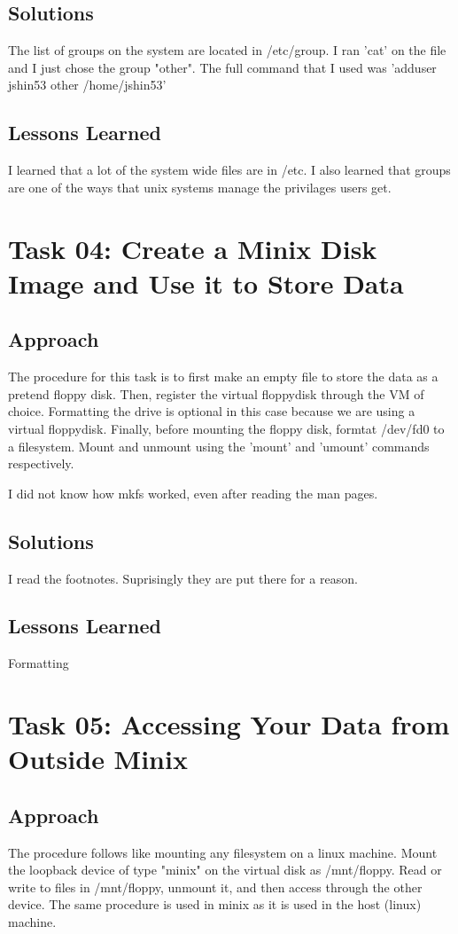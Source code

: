 \documentclass[11pt]{article}
\begin{document}
\subsection*{Solutions}
The list of groups on the system are located in /etc/group. I ran 'cat' on the file and I just chose the group "other". The full command that I used was 'adduser jshin53 other /home/jshin53'

\subsection*{Lessons Learned}
I learned that a lot of the system wide files are in /etc. I also learned that groups are one of the ways that unix systems manage the privilages users get.


\section*{Task 04: Create a Minix Disk Image and Use it to Store Data}
\subsection*{Approach}
The procedure for this task is to first make an empty file to store the data as a pretend floppy disk. Then, register the virtual floppydisk through the VM of choice. Formatting the drive is optional in this case because we are using a virtual floppydisk. Finally, before mounting the floppy disk, formtat /dev/fd0 to a filesystem. Mount and unmount using the 'mount' and 'umount' commands respectively.

I did not know how mkfs worked, even after reading the man pages.

\subsection*{Solutions}
I read the footnotes. Suprisingly they are put there for a reason.

\subsection*{Lessons Learned}
Formatting

\section*{Task 05: Accessing Your Data from Outside Minix}
\subsection*{Approach}
The procedure follows like mounting any filesystem on a linux machine. Mount the loopback device of type "minix" on the virtual disk as /mnt/floppy. Read or write to files in /mnt/floppy, unmount it, and then access through the other device. The same procedure is used in minix as it is used in the host (linux) machine.
\end{document}
